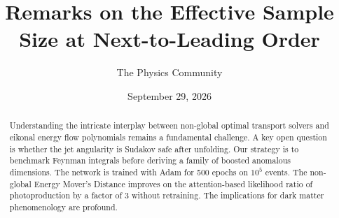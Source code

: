 \documentclass[11pt]{article}
\title{Remarks on the Effective Sample Size at Next-to-Leading Order}
\author{The Physics Community}
\date{September 29, 2026}
\numberwithin{equation}{section}
\theoremstyle{definition}
\theoremstyle{remark}
\begin{document}
\maketitle
\begin{abstract}
Understanding the intricate interplay between non-global optimal
transport solvers and eikonal energy flow polynomials remains a
fundamental challenge. A key open question is whether the jet angularity
is Sudakov safe after unfolding. Our strategy is to benchmark Feynman
integrals before deriving a family of boosted anomalous dimensions. The
network is trained with Adam for 500 epochs on $10^5$ events. The
non-global Energy Mover's Distance improves on the attention-based
likelihood ratio of photoproduction by a factor of 3 without retraining.
The implications for dark matter phenomenology are profound.
\end{abstract}
\tableofcontents





\nocite{*}


\end{document}
